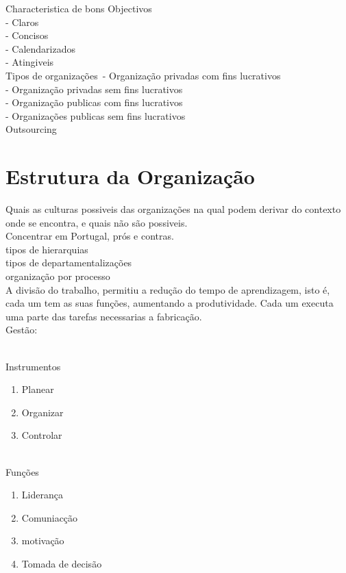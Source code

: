 Characteristica de bons Objectivos\\
- Claros\\
- Concisos\\
- Calendarizados\\
- Atingiveis\\


Tipos de organizações\
- Organização privadas com fins lucrativos\\
- Organização privadas sem fins lucrativos\\
- Organização publicas com fins lucrativos\\
- Organizações publicas sem fins lucrativos\\


Outsourcing\\



\section{Estrutura da Organização}
Quais as culturas possiveis das organizações na qual podem derivar do contexto onde se encontra, e quais não são possiveis.\\

Concentrar em Portugal, prós e contras.\\

tipos de hierarquias\\
tipos de departamentalizações\\
organização por processo\\

A divisão do trabalho, permitiu a redução do tempo de aprendizagem, isto é, cada um tem as suas funções, aumentando a produtividade. Cada um executa uma parte das tarefas necessarias a fabricação.\\

\newpage
Gestão:\\ \\
\begin{minipage}{20cm}
\begin{minipage}{5cm}
Instrumentos
\begin{enumerate}
\item Planear
\item Organizar
\item Controlar\\ \\
\end{enumerate}
\end{minipage}
\begin{minipage}{5cm}
Funções
\begin{enumerate}
\item Liderança
\item Comuniacção
\item motivação
\item Tomada de decisão
\end{enumerate}
\end{minipage}
\end{minipage}

